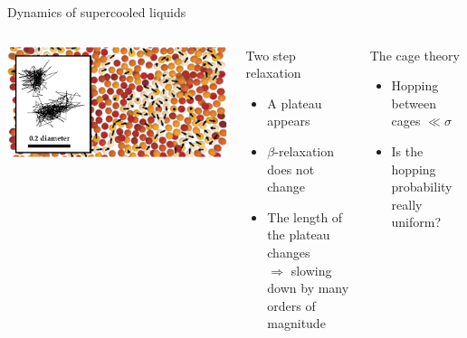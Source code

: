 \documentclass{beamer}
\begin{document}
\begin{frame}{Dynamics of supercooled liquids}
\begin{columns}
	\includegraphics[width=\columnwidth]{cage_weeks}\\
	\begin{block}{Two step relaxation}
	\begin{itemize}
		\item A plateau appears
		\item $\beta$-relaxation does not change
		\item The length of the plateau changes\\ $\Rightarrow$ slowing down by many orders of magnitude
	\end{itemize}
	\end{block}
	\begin{block}{The cage theory}
	\begin{itemize}
		\item Hopping between cages $\ll\sigma$
		\item Is the hopping probability really uniform?
	\end{itemize}
	\end{block}
	\end{columns}
	{\footnotesize\citet{weeks2002pcr}}
\end{frame}
\end{document}
